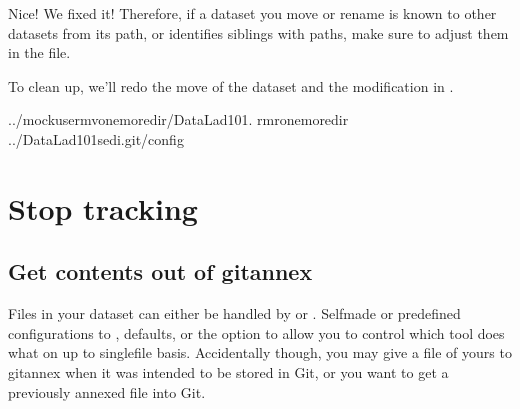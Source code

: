 \sphinxAtStartPar
Nice! We fixed it!
Therefore, if a dataset you move or rename is known to other
datasets from its path, or identifies siblings with paths,
make sure to adjust them in the  file.

\sphinxAtStartPar
To clean up, we’ll redo the move of the dataset and the
modification in .

\begin{sphinxVerbatim}[commandchars=\\\{\}]
../mock\PYGZus{}usermvonemoredir/DataLad\PYGZhy{}101.
rm\PYGZhy{}ronemoredir
../DataLad\PYGZhy{}101sed\PYGZhy{}i.git/config
\end{sphinxVerbatim}


\section{Stop tracking}
\label{\detokenize{basics/101-136-filesystem:stop-tracking}}
\ignorespaces 

\subsection{Get contents out of git\sphinxhyphen{}annex}
\label{\detokenize{basics/101-136-filesystem:get-contents-out-of-git-annex}}\label{\detokenize{basics/101-136-filesystem:index-13}}
\sphinxAtStartPar
Files in your dataset can either be handled by {\hyperref[\detokenize{glossary:term-Git}]{}} or {\hyperref[\detokenize{glossary:term-git-annex}]{}}.
Self\sphinxhyphen{}made or predefined configurations to , defaults, or the
 option to  allow you to control which tool
does what on up to single\sphinxhyphen{}file basis. Accidentally though, you may give a file of yours
to git\sphinxhyphen{}annex when it was intended to be stored in Git, or you want to get a previously
annexed file into Git.

